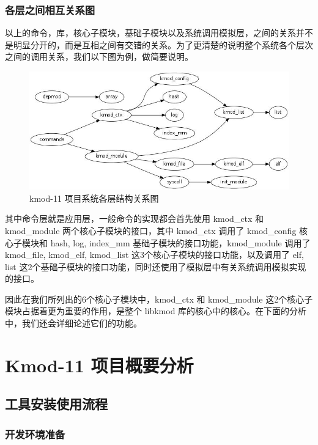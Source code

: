 \subsection{各层之间相互关系图}

以上的命令，库，核心子模块，基础子模块以及系统调用模拟层，之间的关系并不是明显分开的，而是互相之间有交错的关系。为了更清楚的说明整个系统各个层次之间的调用关系，我们以下图为例，做简要说明。

\begin{figure}[htbp]
\centering
\includegraphics{./figures/sys.jpg}
\caption{kmod-11 项目系统各层结构关系图}
\end{figure}

其中命令层就是应用层，一般命令的实现都会首先使用 kmod\_ctx 和
kmod\_module 两个核心子模块的接口，其中 kmod\_ctx 调用了 kmod\_config
核心子模块和 hash, log, index\_mm 基础子模块的接口功能，kmod\_module
调用了 kmod\_file, kmod\_elf, kmod\_list
这3个核心子模块的接口功能，以及调用了 elf, list
这2个基础子模块的接口功能，同时还使用了模拟层中有关系统调用模拟实现的接口。

因此在我们所列出的6个核心子模块中，kmod\_ctx 和 kmod\_module
这2个核心子模块占据着更为重要的作用，是整个 libkmod
库的核心中的核心。在下面的分析中，我们还会详细论述它们的功能。

\chapter{Kmod-11 项目概要分析}

\section{工具安装使用流程}

\subsection{开发环境准备}

